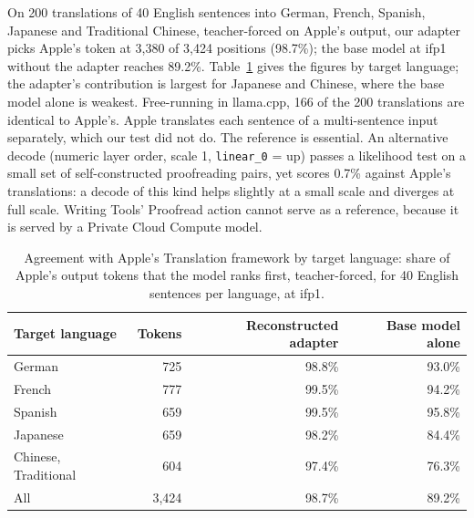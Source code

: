 \documentclass[11pt,reqno]{amsart}
\newcommand{\code}[1]{\texttt{#1}}
\theoremstyle{definition}
\begin{document}
On 200 translations of 40 English sentences into German, French, Spanish, Japanese and Traditional Chinese, teacher-forced on Apple's output, our adapter picks Apple's token at 3{,}380 of 3{,}424 positions (98.7\%); the base model at ifp1 without the adapter reaches 89.2\%. Table~\ref{tab:translation} gives the figures by target language; the adapter's contribution is largest for Japanese and Chinese, where the base model alone is weakest. Free-running in llama.cpp, 166 of the 200 translations are identical to Apple's. Apple translates each sentence of a multi-sentence input separately, which our test did not do. The reference is essential. An alternative decode (numeric layer order, scale 1, \code{linear\_0} = up) passes a likelihood test on a small set of self-constructed proofreading pairs, yet scores 0.7\% against Apple's translations: a decode of this kind helps slightly at a small scale and diverges at full scale. Writing Tools' Proofread action cannot serve as a reference, because it is served by a Private Cloud Compute model.

\begin{table}[H]
\centering\small
\begin{tabular}{@{}lrrr@{}}
\toprule
Target language & Tokens & Reconstructed adapter & Base model alone \\
\midrule
German & 725 & 98.8\% & 93.0\% \\
French & 777 & 99.5\% & 94.2\% \\
Spanish & 659 & 99.5\% & 95.8\% \\
Japanese & 659 & 98.2\% & 84.4\% \\
Chinese, Traditional & 604 & 97.4\% & 76.3\% \\
\midrule
All & 3{,}424 & 98.7\% & 89.2\% \\
\bottomrule
\end{tabular}
\caption{Agreement with Apple's Translation framework by target language: share of Apple's output tokens that the model ranks first, teacher-forced, for 40 English sentences per language, at ifp1.}
\label{tab:translation}
\end{table}
\end{document}
